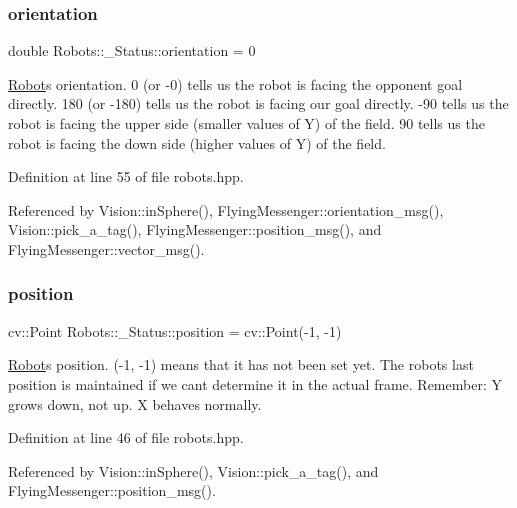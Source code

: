 \subsubsection{\texorpdfstring{orientation}{orientation}}
{\footnotesize\ttfamily double Robots\+::\+\_\+\+Status\+::orientation = 0}

\hyperlink{struct_robots_1_1_robot}{Robot}\textquotesingle{}s orientation. 0 (or -\/0) tells us the robot is facing the opponent goal directly. 180 (or -\/180) tells us the robot is facing our goal directly. -\/90 tells us the robot is facing the upper side (smaller values of Y) of the field. 90 tells us the robot is facing the down side (higher values of Y) of the field. 

Definition at line 55 of file robots.\+hpp.



Referenced by Vision\+::in\+Sphere(), Flying\+Messenger\+::orientation\+\_\+msg(), Vision\+::pick\+\_\+a\+\_\+tag(), Flying\+Messenger\+::position\+\_\+msg(), and Flying\+Messenger\+::vector\+\_\+msg().

\mbox{\label{struct_robots_1_1___status_a9ae95d6ec38055984ee4eaac82138373}} 
\subsubsection{\texorpdfstring{position}{position}}
{\footnotesize\ttfamily cv\+::\+Point Robots\+::\+\_\+\+Status\+::position = cv\+::\+Point(-\/1, -\/1)}

\hyperlink{struct_robots_1_1_robot}{Robot}\textquotesingle{}s position. (-\/1, -\/1) means that it has not been set yet. The robot\textquotesingle{}s last position is maintained if we can\textquotesingle{}t determine it in the actual frame. Remember\+: Y grows down, not up. X behaves normally. 

Definition at line 46 of file robots.\+hpp.



Referenced by Vision\+::in\+Sphere(), Vision\+::pick\+\_\+a\+\_\+tag(), and Flying\+Messenger\+::position\+\_\+msg().

\mbox{\label{struct_robots_1_1___status_a2d97c7aa10c75f32c10d25d0683450a3}} 
